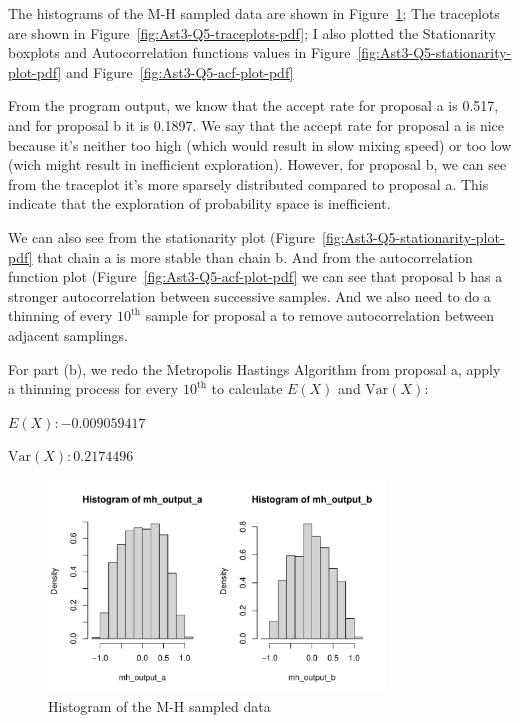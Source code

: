 \documentclass[11pt]{article}
\begin{document}
The histograms of the M-H sampled data are shown in Figure~\ref{fig:Ast3-Q5-hist-pdf};
The traceplots are shown in Figure~\ref{fig:Ast3-Q5-traceplots-pdf};
I also plotted the Stationarity boxplots and Autocorrelation functions values in Figure~\ref{fig:Ast3-Q5-stationarity-plot-pdf} and Figure~\ref{fig:Ast3-Q5-acf-plot-pdf}

From the program output, we know that the accept rate for proposal a is 0.517, and for proposal b it is 0.1897. We say that the accept rate for proposal a is nice because it's neither too high (which would result in slow mixing speed) or too low (wich might result in inefficient exploration). However, for proposal b, we can see from the traceplot it's more sparsely distributed compared to proposal a. This indicate that the exploration of probability space is inefficient.

We can also see from the stationarity plot (Figure~\ref{fig:Ast3-Q5-stationarity-plot-pdf} that chain a is more stable than chain b. And from the autocorrelation function plot (Figure~\ref{fig:Ast3-Q5-acf-plot-pdf} we can see that proposal b has a stronger autocorrelation between successive samples. And we also need to do a thinning of every $10^{\text{th}}$ sample for proposal a to remove autocorrelation between adjacent samplings.

For part (b), we redo the Metropolis Hastings Algorithm from proposal a, apply a thinning process for every $10^{\text{th}}$ to calculate $E(X)$ and $\text{Var}(X)$:

$E(X): -0.009059417$

$\text{Var}(X): 0.2174496 $

\begin{figure}[htpb]
	\centering
	\includegraphics[width=0.8\textwidth]{Ast3-Q5-hist.pdf}
	\caption{Histogram of the M-H sampled data}
	\label{fig:Ast3-Q5-hist-pdf}
\end{figure}
\end{document}
